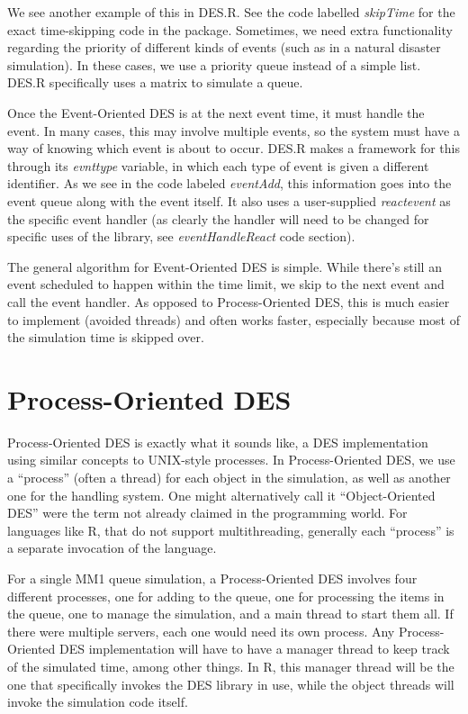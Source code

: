 \documentclass[a4paper, 11pt]{article} %
\begin{document}
We see another example of this in DES.R. See the code labelled \textit{skipTime} for the exact time-skipping code in the package. Sometimes, we need extra functionality regarding the priority of different kinds of events (such as in a natural disaster simulation). In these cases, we use a priority queue instead of a simple list. DES.R specifically uses a matrix to simulate a queue.


Once the Event-Oriented DES is at the next event time, it must handle the event. In many cases, this may involve multiple events, so the system must have a way of knowing which event is about to occur. DES.R makes a framework for this through its \textit{evnttype} variable, in which each type of event is given a different identifier. As we see in the code labeled \textit{eventAdd}, this information goes into the event queue along with the event itself. It also uses a user-supplied \textit{reactevent} as the specific event handler (as clearly the handler will need to be changed for specific uses of the library, see \textit{eventHandleReact} code section).


The general algorithm for Event-Oriented DES is simple. While there's still an event scheduled to happen within the time limit, we skip to the next event and call the event handler. As opposed to Process-Oriented DES, this is much easier to implement (avoided threads) and often works faster, especially because most of the simulation time is skipped over. \newline







\section*{Process-Oriented DES}


Process-Oriented DES is exactly what it sounds like, a DES implementation using similar concepts to UNIX-style processes. In Process-Oriented DES, we use a “process” (often a thread) for each object in the simulation, as well as another one for the handling system. One might alternatively call it “Object-Oriented DES” were the term not already claimed in the programming world. For languages like R, that do not support multithreading, generally each “process” is a separate invocation of the language.


For a single MM1 queue simulation, a Process-Oriented DES involves four different processes, one for adding to the queue, one for processing the items in the queue, one to manage the simulation, and a main thread to start them all. If there were multiple servers, each one would need its own process. Any Process-Oriented DES implementation will have to have a manager thread to keep track of the simulated time, among other things. In R, this manager thread will be the one that specifically invokes the DES library in use, while the object threads will invoke the simulation code itself.
\end{document}
